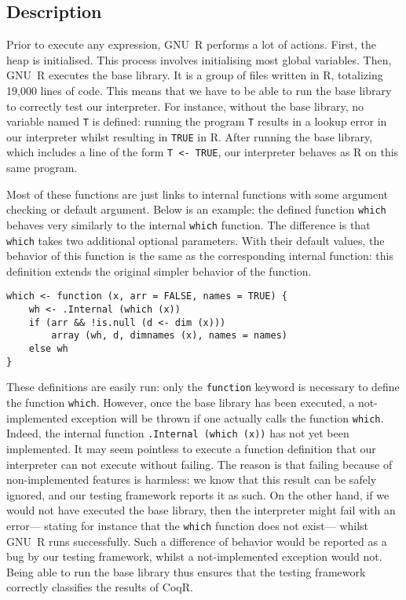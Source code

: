 \documentclass[
    sigplan,
    10pt,
    review, %
    natbib=false %
 ]{acmart}
\newcommand\CoqR{CoqR}
\begin{document}
\subsection{Description}
\label{sec:library:description}

Prior to execute any expression, GNU~R performs a lot of actions.
First, the heap is initialised.
This process involves initialising most global variables.
Then, GNU~R executes the base library.
It is a group of files written in R,
totalizing 19,000 lines of code.
%
This means that we have to be able to run the base library
to correctly test our interpreter.
For instance, without the base library,
no variable named \texttt{T} is defined:
running the program \texttt{T} results in a lookup error
in our interpreter whilst resulting in \texttt{TRUE} in R.
After running the base library,
which includes a line of the form \texttt{T <- TRUE},
our interpreter behaves as R on this same program.

Most of these functions are just links to internal functions
with some argument checking or default argument.
Below is an example:
the defined function \texttt{which} behaves very similarly
to the internal \texttt{which} function.
The difference is that \texttt{which} takes two additional
optional parameters.
With their default values, the behavior of this function
is the same as the corresponding internal function:
this definition extends the original simpler behavior of the function.
\begin{verbatim}
which <- function (x, arr = FALSE, names = TRUE) {
    wh <- .Internal (which (x))
    if (arr && !is.null (d <- dim (x)))
        array (wh, d, dimnames (x), names = names)
    else wh
}
\end{verbatim}

These definitions are easily run:
only the \texttt{function} keyword is necessary
to define the function \texttt{which}.
However, once the base library has been executed,
a not-implemented exception will be thrown
if one actually calls the function \texttt{which}.
Indeed,
the internal function \texttt{.Internal (which (x))}
has not yet been implemented.
%
It may seem pointless to execute a function definition
that our interpreter can not execute without failing.
The reason is that failing because of non-implemented features
is harmless:
we know that this result can be safely ignored,
and our testing framework reports it as such.
On the other hand,
if we would not have executed the base library,
then the interpreter might fail with an error---%
stating for instance that the \texttt{which} function
does not exist---%
whilst GNU~R runs successfully.
Such a difference of behavior would be reported
as a bug by our testing framework,
whilst a not-implemented exception would not.
Being able to run the base library thus ensures
that the testing framework correctly classifies
the results of \CoqR{}.
\end{document}
